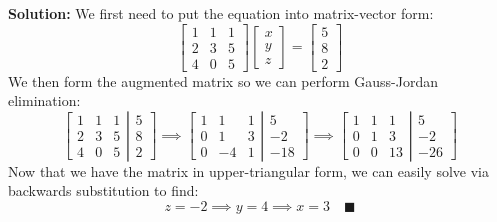 \documentclass[letterpaper, 11pt]{article}
\begin{document}
\begin{enumerate}
\par \textbf{Solution:} We first need to put the equation into matrix-vector form:
\[ \left[ \begin{array}{ccc} 1 & 1 & 1 \\ 2 & 3 & 5 \\ 4 & 0 & 5 \end{array} \right] \left[ \begin{array}{c} x \\ y\\ z\end{array} \right] = \left[ \begin{array}{c} 5 \\ 8 \\ 2\end{array} \right] \]
We then form the augmented matrix so we can perform Gauss-Jordan elimination: 
\[ \left[ \begin{array}{ccc} 1 & 1 & 1 \\ 2 & 3 & 5 \\ 4 & 0 & 5 \end{array} \right| \left. \begin{array}{c} 5 \\ 8 \\ 2\end{array} \right] \implies 
\left[ \begin{array}{ccc} 1 & 1 & 1 \\ 0 & 1 & 3 \\ 0 & -4 & 1 \end{array} \right| \left. \begin{array}{c} 5 \\ -2 \\  -18 \end{array} \right] \implies 
\left[ \begin{array}{ccc} 1 & 1 & 1 \\ 0 & 1 & 3 \\ 0 & 0 & 13 \end{array} \right| \left. \begin{array}{c} 5 \\ -2 \\  -26 \end{array} \right] 
 \]
 Now that we have the matrix in upper-triangular form, we can easily solve via backwards substitution to find:
 \[ z = -2 \implies y = 4 \implies x = 3 \quad\blacksquare\]



\end{enumerate}
\end{document}
